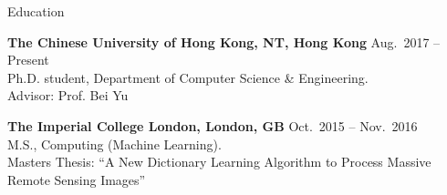 

\begin{rSection}{Education}



{\bf The Chinese University of Hong Kong, NT, Hong Kong} \hfill { Aug.~2017 -- Present}\\
Ph.D. student, Department of Computer Science \& Engineering. \\
Advisor: Prof. Bei Yu

{\bf The Imperial College London, London, GB} \hfill { Oct.~2015 -- Nov.~2016}\\
M.S., Computing (Machine Learning).\\
Masters Thesis: ``A New Dictionary Learning Algorithm to Process Massive Remote Sensing Images'' 
\end{rSection}


